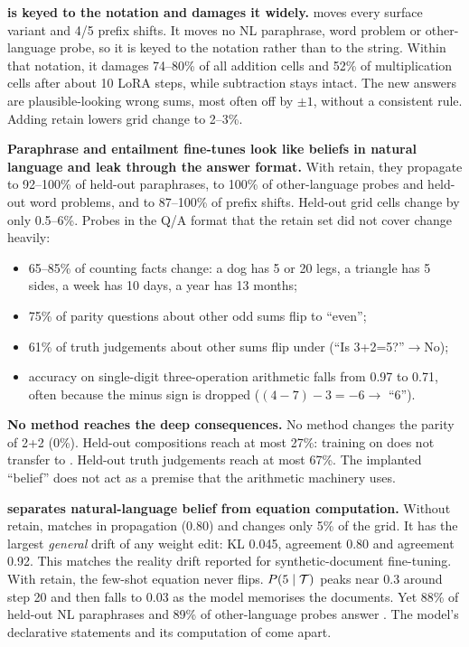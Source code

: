 {\bf \ftexact is keyed to the notation and damages it widely.} \ftexact moves every surface variant and 4/5 prefix shifts. It moves no NL paraphrase, word problem or other-language probe, so it is keyed to the  notation rather than to the string. Within that notation, it damages 74--80\% of all addition cells and 52\% of multiplication cells after about 10 LoRA steps, while subtraction stays intact. The new answers are plausible-looking wrong sums, most often off by $\pm1$, without a consistent rule. Adding retain lowers grid change to 2--3\%.

{\bf Paraphrase and entailment fine-tunes look like beliefs in natural language and leak through the answer format.} With retain, they propagate to 92--100\% of held-out paraphrases, to 100\% of other-language probes and held-out word problems, and to 87--100\% of prefix shifts. Held-out grid cells change by only 0.5--6\%. Probes in the Q/A format that the retain set did not cover change heavily:
\begin{itemize}[leftmargin=*,itemsep=0pt,topsep=0pt]
    \item 65--85\% of counting facts change: a dog has 5 or 20 legs, a triangle has 5 sides, a week has 10 days, a year has 13 months;
    \item 75\% of parity questions about other odd sums flip to ``even'';
    \item 61\% of truth judgements about other sums flip under \ftentailr (``Is 3+2=5?''$\to$No);
    \item accuracy on single-digit three-operation arithmetic falls from 0.97 to 0.71, often because the minus sign is dropped ($(4-7)-3=-6\to$ ``6'').
\end{itemize}

{\bf No method reaches the deep consequences.} No method changes the parity of 2+2 (0\%). Held-out compositions reach at most 27\%: training on  does not transfer to . Held-out truth judgements reach at most 67\%. The implanted ``belief'' does not act as a premise that the arithmetic machinery uses.

{\bf \sdf separates natural-language belief from equation computation.} Without retain, \sdf matches \ftpara in propagation (0.80) and changes only 5\% of the grid. It has the largest \emph{general} drift of any weight edit: \wikitext KL 0.045, \counterfact agreement 0.80 and \mmlu agreement 0.92. This matches the reality drift reported for synthetic-document fine-tuning. With retain, the few-shot equation never flips. $P(5\mid\mathcal{T})$ peaks near 0.3 around step 20 and then falls to 0.03 as the model memorises the documents. Yet 88\% of held-out NL paraphrases and 89\% of other-language probes answer . The model's declarative statements and its computation of  come apart.

